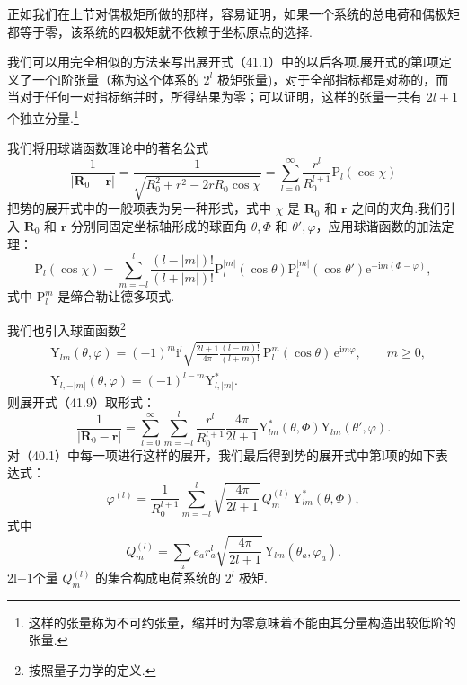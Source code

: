 正如我们在上节对偶极矩所做的那样，容易证明，如果一个系统的总电荷和偶极矩都等于零，该系统的四极矩就不依赖于坐标原点的选择.

我们可以用完全相似的方法来写出展开式（41.1）中的以后各项.展开式的第l项定义了一个l阶张量（称为这个体系的 $2^l$ 极矩张量)，对于全部指标都是对称的，而当对于任何一对指标缩并时，所得结果为零；可以证明，这样的张量一共有 $2l+1$ 个独立分量.\footnote{这样的张量称为不可约张量，缩并时为零意味着不能由其分量构造出较低阶的张量.}

我们将用球谐函数理论中的著名公式
\begin{equation}
  \frac{1}{|\boldsymbol{R}_0-\boldsymbol{r}|}
  =\frac{1}{\sqrt{R_0^2+r^2-2rR_0\cos\chi}}
  =\sum_{l=0}^{\infty}\frac{r^l}{R_0^{l+1}}\mathrm{P}_l(\cos\chi)
\end{equation}
把势的展开式中的一般项表为另一种形式，式中 $\chi$ 是 $\boldsymbol{R}_0$ 和 $\boldsymbol{r}$ 之间的夹角.我们引入 $\boldsymbol{R}_0$ 和 $\boldsymbol{r}$ 分别同固定坐标轴形成的球面角 $\theta,\varPhi$ 和 $\theta',\varphi$，应用球谐函数的加法定理：
\begin{equation}
  \mathrm{P}_l(\cos\chi)=\sum_{m=-l}^{l}
  \frac{(l-|m|)!}{(l+|m|)!}
  \mathrm{P}_l^{|m|}(\cos\theta)\mathrm{P}_l^{|m|}(\cos\theta')
  \mathrm{e}^{-\mathrm{i}m(\varPhi-\varphi)},
\end{equation}
式中 $\mathrm{P}_l^m$ 是缔合勒让德多项式.

我们也引入球面函数\footnote{按照量子力学的定义.}
\begin{equation}
\begin{aligned}
  &\mathrm{Y}_{lm}(\theta,\varphi)=(-1)^m\mathrm{i}^l
  \sqrt{\frac{2l+1}{4\pi}\frac{(l-m)!}{(l+m)!}}\,
  \mathrm{P}_l^m(\cos\theta)\,\mathrm{e}^{\mathrm{i}m\varphi},\qquad m\geqslant 0,\\
  &\mathrm{Y}_{l,-|m|}(\theta,\varphi)=(-1)^{l-m}\mathrm{Y}_{l,|m|}^*.
\end{aligned}
\end{equation}
则展开式（41.9）取形式：
\begin{equation*}
  \frac{1}{|\boldsymbol{R}_0-\boldsymbol{r}|}
  =\sum_{l=0}^{\infty}\sum_{m=-l}^{l}
  \frac{r^l}{R_0^{l+1}}\frac{4\pi}{2l+1}
  \mathrm{Y}_{lm}^{*}(\theta,\varPhi)\mathrm{Y}_{lm}(\theta',\varphi).
\end{equation*}
对（40.1）中每一项进行这样的展开，我们最后得到势的展开式中第l项的如下表达式：
\begin{equation}
  \varphi^{(l)}=\frac{1}{R_0^{l+1}}\sum_{m=-l}^{l}
  \sqrt{\frac{4\pi}{2l+1}}\,Q_m^{(l)}\,\mathrm{Y}_{lm}^{*}(\theta,\varPhi),
\end{equation}
式中
\begin{equation}
  Q_m^{(l)}=\sum_a e_a r_a^l\sqrt{\frac{4\pi}{2l+1}}\,
  \mathrm{Y}_{lm}(\theta_a,\varphi_a).
\end{equation}
2l+1个量 $Q_m^{(l)}$ 的集合构成电荷系统的 $2^l$ 极矩.

